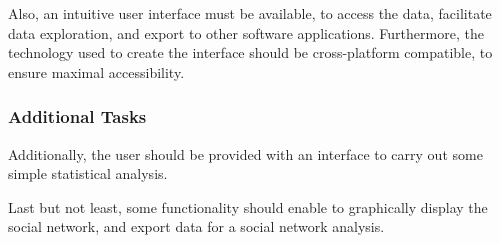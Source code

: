 Also, an intuitive user interface must be available, to access the data, facilitate data exploration, and export to other software applications. Furthermore, the technology used to create the interface should be cross-platform compatible, to ensure maximal accessibility.

\subsubsection{Additional Tasks}
\label{subsubsec:additional}
Additionally, the user should be provided with an interface to carry out some simple statistical analysis.

Last but not least, some functionality should enable to graphically display the social network, and export data for a social network analysis. 